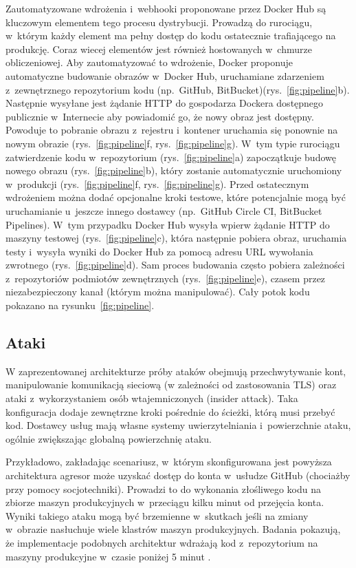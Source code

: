 Zautomatyzowane wdrożenia i~webhooki proponowane przez Docker Hub są kluczowym elementem tego procesu dystrybucji. Prowadzą do rurociągu, w~którym każdy element ma pełny dostęp do kodu ostatecznie trafiającego na produkcję. Coraz wiecej elementów jest również hostowanych w~chmurze obliczeniowej. Aby zautomatyzować to wdrożenie, Docker proponuje automatyczne budowanie obrazów w~Docker Hub, uruchamiane zdarzeniem z~zewnętrznego repozytorium kodu (np.~GitHub, BitBucket)(rys.~\ref{fig:pipeline}b). Następnie wysyłane jest żądanie HTTP do gospodarza Dockera dostępnego publicznie w~Internecie aby powiadomić go, że nowy obraz jest dostępny. Powoduje to pobranie obrazu z~rejestru i~kontener uruchamia się ponownie na nowym obrazie (rys.~\ref{fig:pipeline}f, rys.~\ref{fig:pipeline}g). W~tym typie rurociągu zatwierdzenie kodu w~repozytorium (rys.~\ref{fig:pipeline}a) zapoczątkuje budowę nowego obrazu (rys.~\ref{fig:pipeline}b), który zostanie automatycznie uruchomiony w~produkcji (rys.~\ref{fig:pipeline}f, rys.~\ref{fig:pipeline}g). Przed ostatecznym wdrożeniem można dodać opcjonalne kroki testowe, które potencjalnie mogą być uruchamianie u~jeszcze innego dostawcy (np.~GitHub Circle CI, BitBucket Pipelines). W~tym przypadku Docker Hub wysyła wpierw żądanie HTTP do maszyny testowej (rys.~\ref{fig:pipeline}c), która następnie pobiera obraz, uruchamia testy i~wysyła wyniki do Docker Hub za pomocą adresu URL wywołania zwrotnego (rys.~\ref{fig:pipeline}d). Sam proces budowania często pobiera zależności z~repozytoriów podmiotów zewnętrznych (rys.~\ref{fig:pipeline}e), czasem przez niezabezpieczony kanał (którym można manipulować). Cały potok kodu pokazano na rysunku~\ref{fig:pipeline}.

\subsection{Ataki}

W zaprezentowanej architekturze próby ataków obejmują przechwytywanie kont, manipulowanie komunikacją sieciową (w zależności od zastosowania TLS) oraz ataki z~wykorzystaniem osób wtajemniczonych (insider attack). Taka konfiguracja dodaje zewnętrzne kroki pośrednie do ścieżki, którą musi przebyć kod. Dostawcy usług mają własne systemy uwierzytelniania i~powierzchnie ataku, ogólnie zwiększając globalną powierzchnię ataku.

Przykładowo, zakładając scenariusz, w~którym skonfigurowana jest powyższa architektura agresor może uzyskać dostęp do konta w~usłudze GitHub (chociażby przy pomocy socjotechniki). Prowadzi to do wykonania złośliwego kodu na zbiorze maszyn produkcyjnych w~przeciągu kilku minut od przejęcia konta. Wyniki takiego ataku mogą być brzemienne w~skutkach jeśli na zmiany w~obrazie nasłuchuje wiele klastrów maszyn produkcyjnych. Badania pokazują, że implementacje podobnych architektur wdrażają kod z~repozytorium na maszyny produkcyjne w~czasie poniżej 5 minut \cite{CorPaulHowIsPerformanceAddressedInDevOps}.

